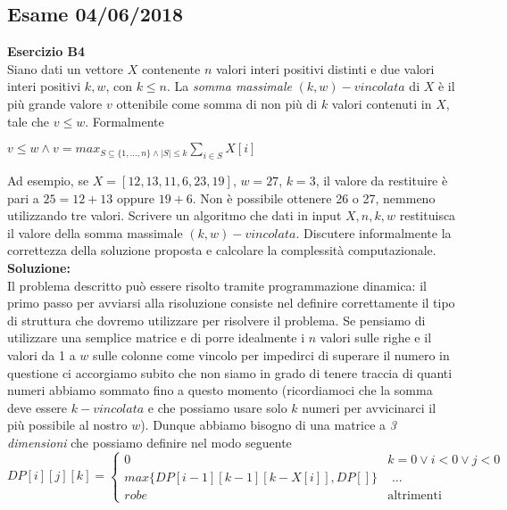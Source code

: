 \documentclass[../cheatSheetAlgoritmi.tex]{subfiles}
\begin{document}
\subsection{Esame 04/06/2018}
\textbf{Esercizio B4}\\
Siano dati un vettore $X$ contenente $n$ valori interi positivi distinti e due valori interi positivi $k, w$, con $k \leq n$. La \emph{somma massimale} $(k, w)-vincolata$ di $X$ è il più grande valore $v$ ottenibile come somma di non più di $k$ valori contenuti in $X$, tale che $v \leq w$. Formalmente
\begin{center}
	$v \leq w \land v = max_{S \subseteq \{1, ..., n\} \land \mid S \mid \leq k} \sum_{i \in S} X[i]$\\
\end{center}
Ad esempio, se $X = [12,13,11,6,23,19]$, $w = 27$, $k= 3$, il valore da restituire è pari a $25 = 12 + 13$ oppure $19 + 6$. Non è possibile ottenere 26 o 27, nemmeno utilizzando tre valori. Scrivere un algoritmo che dati in input $X,n,k,w$ restituisca il valore della somma massimale $(k, w)-vincolata$. Discutere informalmente la correttezza della   soluzione proposta e calcolare la complessità computazionale.\\
\textbf{Soluzione:}\\
Il problema descritto può essere risolto tramite programmazione dinamica: il primo passo per avviarsi alla risoluzione consiste nel definire correttamente il tipo di struttura che dovremo utilizzare per risolvere il problema. Se pensiamo di utilizzare una semplice matrice e di porre idealmente i $n$ valori sulle righe e il valori da 1 a $w$ sulle colonne come vincolo per impedirci di superare il numero in questione ci accorgiamo subito che non siamo in grado di tenere traccia di quanti numeri abbiamo sommato fino a questo momento (ricordiamoci che la somma deve essere $k-vincolata$ e che possiamo usare solo $k$ numeri per avvicinarci il più possibile al nostro $w$). Dunque abbiamo bisogno di una matrice a \emph{3 dimensioni} che possiamo definire nel modo seguente
\begin{equation*}
  	DP[i][j][k]=\begin{cases}
  		0 & \text{$k = 0 \lor i < 0 \lor j < 0$}\\
  		max\{DP[i-1][k-1][k - X[i]], DP[]\} &\text{ ... }\\
    	robe & \text{altrimenti}
  	\end{cases}
\end{equation*} 
\end{document}
